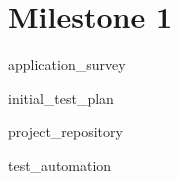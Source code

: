 \section{Milestone 1}

{application_survey}

{initial_test_plan}

{project_repository}

{test_automation}
